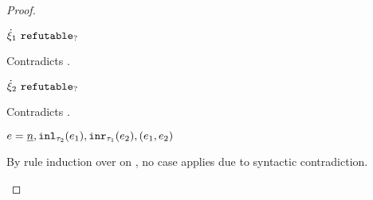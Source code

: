 \begin{proof}
\begin{byCases}
\begin{byCases}
        \begin{pfsteps*}
        \item $\dot{\xi}_1 ~\mathtt{refutable}_?$ 
        \end{pfsteps*}
        Contradicts .
    \item[\text{(\ref{rule:RXPairR})}]
        \begin{pfsteps*}
        \item $\dot{\xi}_2 ~\mathtt{refutable}_?$ 
        \end{pfsteps*}
        Contradicts .
    \end{byCases}
\item
    \begin{pfsteps*}
    \item $e=\underline{n},\mathtt{inl}_{\tau_2}({e_1}),\mathtt{inr}_{\tau_1}({e_2}),(e_1 , e_2)$ 
    \end{pfsteps*}
    By rule induction over  on , no case applies due to syntactic contradiction.
\end{byCases}
\resetpfcounter
\end{proof}

